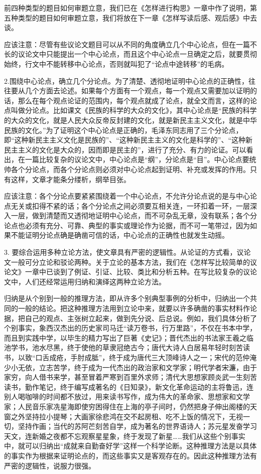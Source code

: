 前四种类型的题目如何审题立意，我们已在《怎样进行构思》一章中作了说明，第五种类型的题目如何审题立意，我们将放在下一章《怎样写读后感、观后感》中去谈。

应该注意：尽管有些议论文题目可以从不同的角度确立几个中心论点，但在一篇不长的议论文中只能提出一个中心论点，而且这个中心论点一旦确定之后，就要贯彻始终，行文中不能转移中心论点，否则就叫犯了“论点中途转移”的毛病。

2.围绕中心论点，确立几个分论点。为了清楚、透彻地证明中心论点的正确性，往往要从几个方面去论述。如果每个方面有一个观点，每一个观点又需要加以证明的话，那么在每个观点论证的范围内，每个观点就成了论点，就全文而言，这样的论点叫做分论点。比如课文《民族的科学的大众的文化》，其中心论点是“民族的科学的大众的文化，就是人民大众反帝反封建的文化，就是新民主主义文化，就是中华民族的文化。”为了证明这个中心论点是正确的，毛泽东同志用了三个分论点，即“这种新民主主义文化是民族的”、“这种新民主主义的文化是科学的”、“这种新民主主义的文化是大众的，因而即是民主的”，进行了充分、有力的论证。可以看出，在一篇比较复杂的议论文中，中心论点是“纲”，分论点是“目”。中心论点要统帅各个分论点，而各个分论点则必须对中心论点起到证明、补充或发挥的作用。只有这样，文章才能条分缕析，纲举目张。

应该注意：各个分论点要紧紧围绕着一个中心论点，不允许分论点说的是与中心论点无关或扣得不紧的话；各个分论点之间必须要互相关连，一环扣着一环，一层深入一层，做到清楚而又透彻地证明中心论点，而不可杂乱无章，没有联系；各个分论点也必须有充分、可靠、典型的事实或理论作为论据，而不可一笔带过，因为如果不能证明分论点确是确凿可信的话，中心论点的正确性也就发生动摇。

3. 要综合运用多种立论方法，使文章具有严密的逻辑性。从论证的方式看，议论文一般可分立论和驳论两种。关于立论的基本方法，我们在《怎样写比较简单的议论文》一章中已谈到了例证、引证、比较、类比和分析五种。在写比较复杂的议论文中，人们还经常运用归纳和演绎这两种立论方法。

归纳是从个别到一般的推理方法，即从许多个别典型事例的分析中，归纳出一个共同的一般的结论。把这种推理方法用到立论中来，就要以许多确凿的事实材料作论据，把自己的观点、主张树立起来，做到先分说、后总说。例如，我们具体分析了个别事实，象西汉杰出的历史家司马迁“读万卷书，行万里路”，不仅在书本中学，而且到实践中学，以毕生的精力写出了巨著《史记》；晋代杰出的书法家王羲之临池学书，池水尽黑，终于使他的草隶冠绝古今；唐代大诗人白居易年轻时刻苦读书，以致“口舌成疮，手肘成胝”，终于成为唐代三大顶峰诗人之一；宋代的范仲淹少小无依，立志苦学，终于成为一代杰出的政治家和文学家；明代学者宋濂，由于家穷，向人借书来学，甚至冒着严寒到百里外求师；清代大思想家顾炎武一生刻苦读书，勤作笔记，终于编写成著名的《日知录》，新文化革命运动的主将鲁迅，连别人喝咖啡的时间都不放过，用来读书写作，成为伟大的革命家、思想家和文学家；人民音乐家冼星海即使穷困得住在上海的亭子间时，仍然把身子伸出阁楼的天窗之外坚持拉小提琴；大画家徐悲鸿在交不起房租、吃不上饭的情况下，无视一切，坚持作画；当代的苏阿芒刻苦自学，成为著名的世界语诗人；苏元星发奋学习天文，连新婚之夜都不忘观察星星象，终于发现了新星……我们从这些个别事实中，就可以归纳出“成就来自勤奋好学”这样一个科学论断。这种推理方法是以具体的事实作为根据来证明论点的，而这些事实又是客观存在的。因此这种推理方法有严密的逻辑性，说服力很强。

